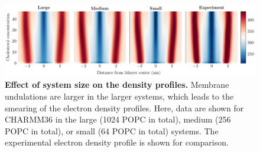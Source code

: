 \documentclass[journal=jpcbfk]{achemso}
\begin{document}
\begin{figure}[htb!]
    \centering
    \includegraphics[width=\linewidth]{../FIGS/densityprofiles_size.pdf}
    \caption{\label{SIfig:densprofssize}%
    \textbf{Effect of system size on the density profiles.}
    Membrane undulations are larger in the larger systems, which leads to the smearing of the electron density profiles. Here, data are shown for CHARMM36 in the large (1024 POPC in total), medium (256 POPC in total), or small (64 POPC in total) systems. The experimental electron density profile is shown for comparison.
    }
\end{figure}

\clearpage



\end{document}
